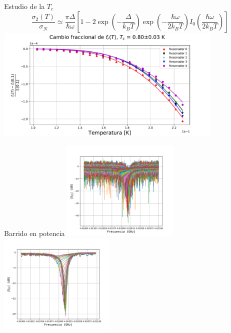 \documentclass[ignorenonframetext,12pt]{beamer}
\begin{document}
\begin{frame}{Estudio de la $T_c$}
												\begin{equation}
																\frac{\sigma_2(T)}{\sigma_N} \simeq
																\frac{\pi \Delta}{\hbar
																\omega}\left[1-2\exp \left(-\frac{\Delta}{k_B
																T}\right)\exp \left(-\frac{\hbar \omega}{2 
																k_B T}\right)
																I_0 \left(\frac{\hbar \omega}{2 k_B T}\right)\right]
												\end{equation}
				\centering
												\includegraphics[width=0.82\textwidth]{delta_f_vs_temp}
\end{frame}
\begin{frame}{Barrido en potencia}
				\centering
												\includegraphics[width=0.42\textwidth]{resonador0_asc_sin_filtro}
												\includegraphics[width=0.42\textwidth]{resonador0_asc_filtro}
\end{frame}
\end{document}
